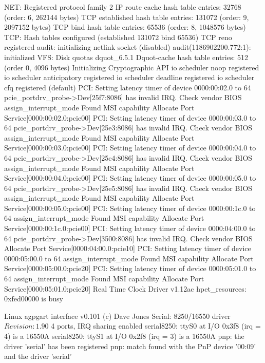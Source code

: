 \documentclass[mingoth,a4paper]{jsarticle}
\begin{document}
{{{{{\begin{commandline}
NET: Registered protocol family 2
IP route cache hash table entries: 32768 (order: 6, 262144 bytes)
TCP established hash table entries: 131072 (order: 9, 2097152 bytes)
TCP bind hash table entries: 65536 (order: 8, 1048576 bytes)
TCP: Hash tables configured (established 131072 bind 65536)
TCP reno registered
audit: initializing netlink socket (disabled)
audit(1186902200.772:1): initialized
VFS: Disk quotas dquot_6.5.1
Dquot-cache hash table entries: 512 (order 0, 4096 bytes)
Initializing Cryptographic API
io scheduler noop registered
io scheduler anticipatory registered
io scheduler deadline registered
io scheduler cfq registered (default)
PCI: Setting latency timer of device 0000:00:02.0 to 64
pcie_portdrv_probe->Dev[25f7:8086] has invalid IRQ. Check vendor BIOS
assign_interrupt_mode Found MSI capability
Allocate Port Service[0000:00:02.0:pcie00]
PCI: Setting latency timer of device 0000:00:03.0 to 64
pcie_portdrv_probe->Dev[25e3:8086] has invalid IRQ. Check vendor BIOS
assign_interrupt_mode Found MSI capability
Allocate Port Service[0000:00:03.0:pcie00]
PCI: Setting latency timer of device 0000:00:04.0 to 64
pcie_portdrv_probe->Dev[25e4:8086] has invalid IRQ. Check vendor BIOS
assign_interrupt_mode Found MSI capability
Allocate Port Service[0000:00:04.0:pcie00]
PCI: Setting latency timer of device 0000:00:05.0 to 64
pcie_portdrv_probe->Dev[25e5:8086] has invalid IRQ. Check vendor BIOS
assign_interrupt_mode Found MSI capability
Allocate Port Service[0000:00:05.0:pcie00]
PCI: Setting latency timer of device 0000:00:1c.0 to 64
assign_interrupt_mode Found MSI capability
Allocate Port Service[0000:00:1c.0:pcie00]
PCI: Setting latency timer of device 0000:04:00.0 to 64
pcie_portdrv_probe->Dev[3500:8086] has invalid IRQ. Check vendor BIOS
Allocate Port Service[0000:04:00.0:pcie10]
PCI: Setting latency timer of device 0000:05:00.0 to 64
assign_interrupt_mode Found MSI capability
Allocate Port Service[0000:05:00.0:pcie20]
PCI: Setting latency timer of device 0000:05:01.0 to 64
assign_interrupt_mode Found MSI capability
Allocate Port Service[0000:05:01.0:pcie20]
Real Time Clock Driver v1.12ac
hpet_resources: 0xfed00000 is busy
\end{commandline}
\begin{commandline}
Linux agpgart interface v0.101 (c) Dave Jones
Serial: 8250/16550 driver $Revision: 1.90 $ 4 ports, IRQ sharing enabled
serial8250: ttyS0 at I/O 0x3f8 (irq = 4) is a 16550A
serial8250: ttyS1 at I/O 0x2f8 (irq = 3) is a 16550A
pnp: the driver 'serial' has been registered
pnp: match found with the PnP device '00:09' and the driver 'serial'

\end{commandline}}}}}}
\end{document}
